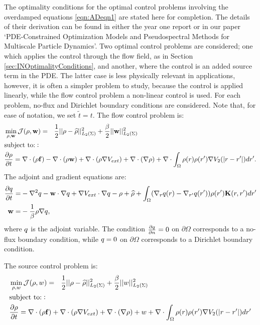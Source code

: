 The optimality conditions for the optimal control problems involving the overdamped equations \eqref{eqn:ADeqn1} are stated here for completion. The details of their derivation can be found in either the year one report or in our paper `PDE-Constrained Optimization Models and Pseudospectral Methods for Multiscale Particle Dynamics'.
Two optimal control problems are considered; one which applies the control through the flow field, as in Section \ref{sec:INOptimalityConditions}, and another, where the control is an added source term in the PDE. The latter case is less physically relevant in applications, however, it is often a simpler problem to study, because the control is applied linearly, while the flow control problem a non-linear control is used. For each problem, no-flux and Dirichlet boundary conditions are considered. Note that, for ease of notation, we set $\tilde t = t$.
The flow control problem is:
\begin{align}
\label{eqn:ADFlowOCP}
&\min_{\rho,\mathbf{w} } \mathcal J(\rho,\mathbf{w} ) =\ \ \frac{1}{2}||\rho - \widehat \rho||_{L_2(\Sigma)}^2  +\frac{\beta}{2}||\mathbf{w}||_{L_2(\Sigma)}^2\\
& \text{subject to:}: \notag\\
&\frac{\partial \rho}{\partial t} = \nabla \cdot (\rho\f) - \nabla \cdot (\rho \mathbf{w})  + \nabla \cdot (\rho\nabla V_{ext}) + \nabla \cdot (\nabla \rho) +\nabla \cdot \int_\Omega \rho(r)\rho(r') \nabla V_2(|r-r'|)dr'. \notag
\end{align}
The adjoint and gradient equations are:
\begin{align*}
\frac{\partial q}{\partial t} =& - \nabla^2q - \mathbf{w} \cdot \nabla q + \nabla V_{ext} \cdot \nabla q - \rho + \widehat \rho+\int_\Omega (\nabla_r q(r) - \nabla_{r'} q(r') ) \rho(r') \mathbf{K}(r,r') dr'\\
\mathbf{w} =& - \frac{1}{\beta} \rho \nabla q,
\end{align*}
where $q$ is the adjoint variable. The condition $\frac{\partial q}{\partial n} = 0$ on $\partial \Omega$ corresponds to a no-flux boundary condition, while $q = 0$ on $\partial \Omega$ corresponds to a Dirichlet boundary condition.

The source control problem is:
\begin{align}
\label{eqn:AdvDiffLinear}
&\min_{\rho,{w} } \mathcal J(\rho,{w}) = \ \ \frac{1}{2}||\rho - \widehat \rho||_{L_2(\Sigma)}^2  +\frac{\beta}{2}||{w}||_{L_2(\Sigma)}^2\\
& \text{subject to:}: \notag \\
&\frac{\partial \rho}{\partial  t} = \nabla \cdot (\rho\mathbf{f}) + \nabla \cdot (\rho\nabla V_{ext}) + \nabla \cdot (\nabla \rho) + w \notag +\nabla \cdot \int_\Omega \rho(r)\rho(r') \nabla V_2(|r-r'|)dr' \notag
\end{align}

